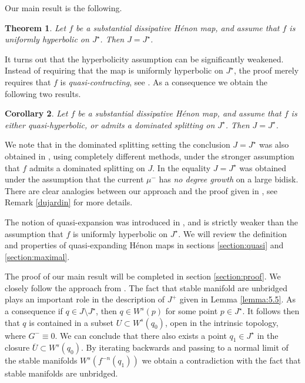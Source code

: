 \documentclass[10pt,a4paper]{article}
\newtheorem{theorem}{Theorem}[section]
\newtheorem{corollary}[theorem]{Corollary}
\begin{document}
Our main result is the following.

\begin{theorem}
\label{maintheorem}
Let $f$ be a substantial dissipative H\'enon map, and assume that $f$ is uniformly hyperbolic on $J^\star$. Then $J = J^\star$.
\end{theorem}

It turns out that the hyperbolicity assumption can be significantly weakened. Instead of requiring that the map is uniformly hyperbolic on $J^\star$, the proof merely requires that $f$ is \emph{quasi-contracting}, see \cite{BS8}. As a consequence we obtain the following two results.

\begin{corollary}
Let $f$ be a substantial dissipative H\'enon map, and assume that $f$ is either quasi-hyperbolic, or admits a dominated splitting on $J^\star$. Then $J = J^\star$.
\end{corollary}

We note that in the dominated splitting setting the conclusion $J = J^\star$ was also obtained in \cite{LP2}, using completely different methods, under the stronger assumption that $f$ admits a dominated splitting on $J$. In \cite{D} the equality $J=J^\star$ was obtained under the assumption that the current $\mu^-$ has \emph{no degree growth} on a large bidisk. There are clear analogies between our approach and the proof given in \cite{D}, see Remark \ref{dujardin} for more details.

The notion of quasi-expansion was introduced in \cite{BS8}, and is strictly weaker than the assumption that $f$ is uniformly hyperbolic on $J^\star$. We will review the definition and properties of quasi-expanding H\'enon maps in sections \ref{section:quasi} and \ref{section:maximal}.

The proof of our main result will be completed in section \ref{section:proof}. We closely follow the approach from \cite{F}. The fact that stable manifold are unbridged plays an important role in the description of $J^+$ given in Lemma \ref{lemma:5.5}. As a consequence if $q \in J \setminus J^\star$, then $q \in W^s(p)$ for some point $p \in J^\star$. It follows then that $q$ is contained in a subset $U \subset W^s(q_0)$, open in the intrinsic topology, where $G^- \equiv 0$. We can conclude that there also exists a point $q_1 \in J^\star$ in the closure $\overline{U}\subset W^s(q_0)$. By iterating backwards and passing to a normal limit of the stable manifolds $W^s(f^{-n}(q_1))$ we obtain a contradiction with the fact that stable manifolds are unbridged.
\end{document}
